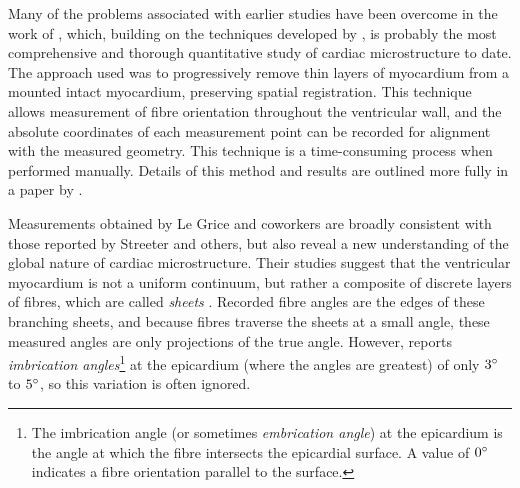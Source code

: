 Many of the problems associated with earlier studies have been overcome in the
work of \citet{legrice:1992}, which, building on the techniques developed
by \citet{nielsen:1987}, is probably the most comprehensive and thorough
quantitative study of cardiac microstructure to date.
The approach used was to progressively remove thin layers of myocardium from a
mounted intact myocardium, preserving spatial registration.  This technique
allows measurement of fibre orientation throughout the ventricular wall, and
the absolute coordinates of each measurement point can be recorded for
alignment with the measured geometry.  This technique is a time-consuming
process when performed manually.  Details of this method and results are
outlined more fully in a paper by \citet{nielsen:1991a}.

Measurements obtained by Le Grice and coworkers are broadly consistent with
those reported by Streeter and others, but also reveal a new understanding of
the global nature of cardiac microstructure.  Their studies suggest that the
ventricular myocardium is not a uniform continuum, but rather a composite of
discrete layers of fibres, which are called \emph{sheets}
\cite{legrice:1992,legrice:1995a,smaill:glass:1991}.  Recorded fibre angles
are the edges of these branching sheets, and because fibres traverse the
sheets at a small angle, these measured angles are only projections of the
true angle.  However, \citet{streeter:1979} reports \emph{imbrication
  angles}\footnote{The imbrication angle (or sometimes \emph{embrication
    angle}) at the epicardium is the angle at which the fibre intersects the
  epicardial surface.  A value of $0^{\circ}$ indicates a fibre orientation
  parallel to the surface.} at the epicardium (where the angles are greatest)
of only $3^{\circ}$ to $5^{\circ}$, so this variation is often ignored.

